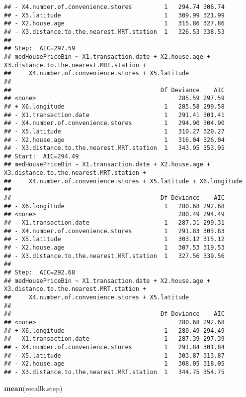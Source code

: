 \documentclass[
]{article}
\newenvironment{Shaded}{\begin{snugshade}}{\end{snugshade}}
\newcommand{\KeywordTok}[1]{\textcolor[rgb]{0.13,0.29,0.53}{\textbf{#1}}}
\newcommand{\NormalTok}[1]{#1}
\begin{document}
\begin{verbatim}
## - X4.number.of.convenience.stores         1   294.74 306.74
## - X5.latitude                             1   309.99 321.99
## - X2.house.age                            1   315.86 327.86
## - X3.distance.to.the.nearest.MRT.station  1   326.53 338.53
## 
## Step:  AIC=297.59
## medHousePriceBin ~ X1.transaction.date + X2.house.age + X3.distance.to.the.nearest.MRT.station + 
##     X4.number.of.convenience.stores + X5.latitude
## 
##                                          Df Deviance    AIC
## <none>                                        285.59 297.59
## + X6.longitude                            1   285.58 299.58
## - X1.transaction.date                     1   291.41 301.41
## - X4.number.of.convenience.stores         1   294.90 304.90
## - X5.latitude                             1   310.27 320.27
## - X2.house.age                            1   316.04 326.04
## - X3.distance.to.the.nearest.MRT.station  1   343.95 353.95
## Start:  AIC=294.49
## medHousePriceBin ~ X1.transaction.date + X2.house.age + X3.distance.to.the.nearest.MRT.station + 
##     X4.number.of.convenience.stores + X5.latitude + X6.longitude
## 
##                                          Df Deviance    AIC
## - X6.longitude                            1   280.68 292.68
## <none>                                        280.49 294.49
## - X1.transaction.date                     1   287.31 299.31
## - X4.number.of.convenience.stores         1   291.83 303.83
## - X5.latitude                             1   303.12 315.12
## - X2.house.age                            1   307.53 319.53
## - X3.distance.to.the.nearest.MRT.station  1   327.56 339.56
## 
## Step:  AIC=292.68
## medHousePriceBin ~ X1.transaction.date + X2.house.age + X3.distance.to.the.nearest.MRT.station + 
##     X4.number.of.convenience.stores + X5.latitude
## 
##                                          Df Deviance    AIC
## <none>                                        280.68 292.68
## + X6.longitude                            1   280.49 294.49
## - X1.transaction.date                     1   287.39 297.39
## - X4.number.of.convenience.stores         1   291.84 301.84
## - X5.latitude                             1   303.87 313.87
## - X2.house.age                            1   308.05 318.05
## - X3.distance.to.the.nearest.MRT.station  1   344.75 354.75
\end{verbatim}

\begin{Shaded}
\begin{Highlighting}[]
\KeywordTok{mean}\NormalTok{(recallk.step)}
\end{Highlighting}
\end{Shaded}
\end{document}
